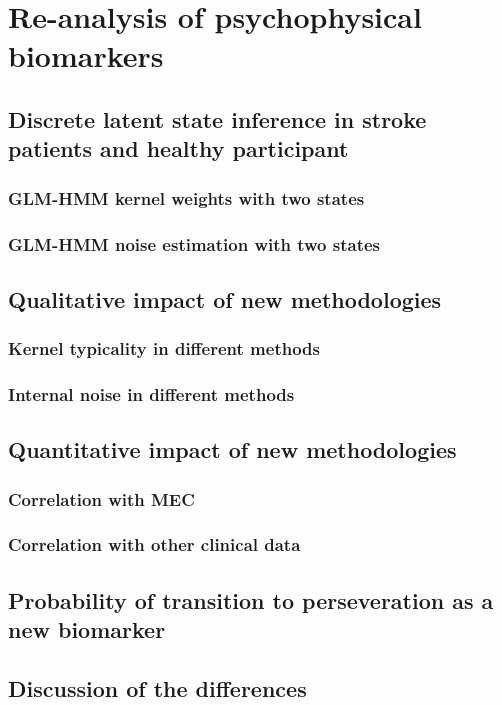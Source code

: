 \renewcommand{\chaptername}{Chapter} 
\chapter{Re-analysis of psychophysical biomarkers}\label{chap8}

\section {Discrete latent state inference in stroke patients and healthy participant} 

\subsection{GLM-HMM kernel weights with two states}

\subsection {GLM-HMM noise estimation with two states}


\section{Qualitative impact of new methodologies}

\subsection{Kernel typicality in different methods}

\subsection{Internal noise in different methods}

\section{Quantitative impact of new methodologies}
\subsection {Correlation with MEC} 

\subsection {Correlation with other clinical data} 

\section{Probability of transition to perseveration as a new biomarker} 


\section{Discussion of the differences} 